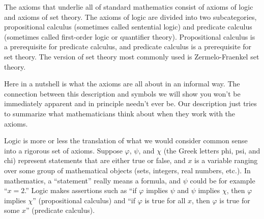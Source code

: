 The axioms that underlie all of standard mathematics consist of axioms of logic
and axioms of set theory. The axioms of logic are divided into two
subcategories, propositional calculus (sometimes
called sentential logic) and predicate calculus
(sometimes called first-order logic or quantifier theory).  Propositional
calculus is a prerequisite for predicate calculus, and predicate calculus is a
prerequisite for set theory.  The version of set theory most commonly used is
Zermelo-Fraenkel set theory.

Here in a nutshell is what the axioms are all about in an informal way. The
connection between this description and symbols we will show you won't be
immediately apparent and in principle needn't ever be.  Our description just
tries to summarize what mathematicians think about when they work with the
axioms.

Logic is more or less the translation of what we would consider common sense
into a rigorous set of axioms.  Suppose $\varphi$,
$\psi$, and $\chi$ (the Greek letters phi, psi, and chi) represent statements
that are either true or false, and $x$ is a variable ranging over some group of mathematical objects (sets, integers,
real numbers, etc.). In mathematics, a ``statement'' really means a formula,
and $\psi$ could be for example ``$x = 2$.'' Logic makes assertions such as
``if $\varphi$ implies $\psi$ and $\psi$ implies $\chi$, then $\varphi$
implies $\chi$'' (propositional calculus) and
``if $\varphi$ is true for all $x$, then $\varphi$ is true for some $x$''
(predicate calculus).

